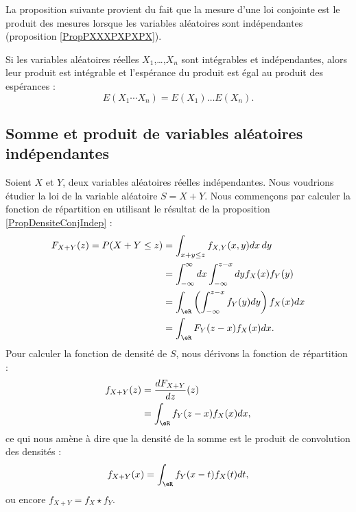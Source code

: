 La proposition suivante\cite{ProbaDanielLi} provient du fait que la mesure d'une loi conjointe est le produit des mesures lorsque les variables aléatoires sont indépendantes (proposition \ref{PropPXXXPXPXPX}).
\begin{proposition}
    Si les variables aléatoires réelles \( X_1\),\ldots,\( X_n\) sont intégrables et indépendantes, alors leur produit est intégrable et l'espérance du produit est égal au produit des espérances :
    \begin{equation}
        E(X_1\cdots X_n)=E(X_1)\ldots E(X_n).
    \end{equation}
\end{proposition}

\subsection{Somme et produit de variables aléatoires indépendantes}
\label{subsecscnvommevariablsindep}


Soient \( X\) et \( Y\), deux variables aléatoires réelles indépendantes. Nous voudrions étudier la loi de la variable aléatoire \( S=X+Y\). Nous commençons par calculer la fonction de répartition en utilisant le résultat de la proposition \ref{PropDensiteConjIndep} :
\begin{subequations}
    \begin{align}
        F_{X+Y}(z)=P(X+Y\leq z)&=\int_{x+y\leq z}f_{X,Y}(x,y)dx\,dy\\
        &=\int_{-\infty}^{\infty}dx\int_{-\infty}^{z-x}dyf_X(x)f_Y(y)\\
        &=\int_{\eR}\left( \int_{-\infty}^{z-x}f_Y(y)dy \right)f_X(x)dx\\
        &=\int_{\eR}F_Y(z-x)f_X(x)dx.
    \end{align}
\end{subequations}
Pour calculer la fonction de densité de \( S\), nous dérivons la fonction de répartition :
\begin{subequations}
    \begin{align}
        f_{X+Y}(z)&=\frac{ d F_{X+Y} }{ d z }(z)\\
        &=\int_{\eR}f_Y(z-x)f_X(x)dx,
    \end{align}
\end{subequations}
ce qui nous amène à dire que la densité de la somme est le produit de convolution des densités :
\begin{equation}        \label{EqdensitesooemXYint}
    f_{X+Y}(x)=\int_{\eR}f_Y(x-t)f_X(t)dt,
\end{equation}
ou encore \( f_{X+Y}=f_X\star f_Y\).


